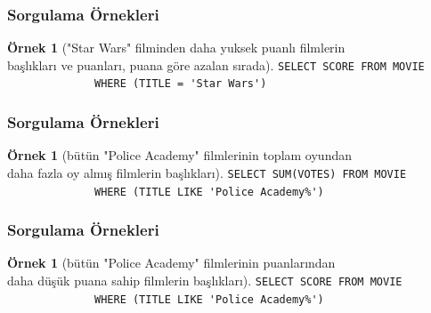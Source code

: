 \documentclass[dvipsnames]{beamer}
\theoremstyle{definition}
\theoremstyle{example}
\newtheorem{ornek}[theorem]{Örnek}
\theoremstyle{plain}
\begin{document}
\begin{frame}[fragile]
  \frametitle{Sorgulama Örnekleri}

  \begin{ornek}["Star Wars" filminden daha yuksek puanlı filmlerin\\
                başlıkları ve puanları, puana göre azalan sırada]
\lstinline!SELECT SCORE FROM MOVIE!\\
~~~~~~~~~~~~~~\lstinline!WHERE (TITLE = 'Star Wars')!
  \end{ornek}
\end{frame}

\begin{frame}[fragile]
  \frametitle{Sorgulama Örnekleri}

  \begin{ornek}[bütün "Police Academy" filmlerinin toplam oyundan\\
                daha fazla oy almış filmlerin başlıkları]
\lstinline!SELECT SUM(VOTES) FROM MOVIE!\\
~~~~~~~~~~~~~~\lstinline!WHERE (TITLE LIKE 'Police Academy%')!
  \end{ornek}
\end{frame}

\begin{frame}[fragile]
  \frametitle{Sorgulama Örnekleri}

  \begin{ornek}[bütün "Police Academy" filmlerinin puanlarından\\
                daha düşük puana sahip filmlerin başlıkları]
\lstinline!SELECT SCORE FROM MOVIE!\\
~~~~~~~~~~~~~~\lstinline!WHERE (TITLE LIKE 'Police Academy%')!
  \end{ornek}
\end{frame}
\end{document}
